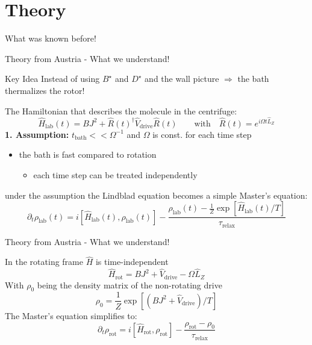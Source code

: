 \section{Theory}
\begin{frame}{What was known before!}
    
\end{frame}
\begin{frame}{Theory from Austria - What we understand!}
    \begin{bigidea}{Key Idea}
        Instead of using $B^\star$ and $D^\star$ and the wall picture $\Rightarrow$ the bath thermalizes the rotor!
    \end{bigidea}
    The Hamiltonian that describes the molecule in the centrifuge:
     \[
  \boxed{
    \hat{H}_{\mathrm{lab}}(t) =
  BJ^2 + \hat{R}(t)^\dagger
  \hat{V}_{\mathrm{drive}}\hat{R}(t) 
  }
  \qquad \text{with}\quad
  \hat{R}(t) = e^{i\Omega t \hat{L}_{Z}}
\]
\textbf{1. Assumption:} $t_{\mathrm{bath}} << \Omega^{-1}$ and $\Omega$ is const. for each time step
\begin{itemize}
    \item the bath is fast compared to rotation
    \begin{itemize}
        \item each time step can be treated independently
    \end{itemize}
\end{itemize}
\vspace{0.1cm}
under the assumption the Lindblad equation becomes a simple Master's equation:
\[
\partial_t \rho_{\mathrm{lab}}(t)
=
i\left[\hat{H}_{\mathrm{lab}}(t), \rho_{\mathrm{lab}}(t)\right]
-
\frac{
\rho_{\mathrm{lab}}(t)
-
\frac{1}{Z}\exp\!\left[\hat{H}_{\mathrm{lab}}(t)/T\right]
}{
\tau_{\mathrm{relax}}
}
\]
    
\end{frame}

\begin{frame}{Theory from Austria - What we understand!}
   
In the rotating frame $\hat{H}$ is time-independent
        \[
  \boxed{
    \hat{H}_{\mathrm{rot}} =
  BJ^2 + \hat{V}_{\mathrm{drive}} - \Omega \hat{L}_Z
  }
\]
With $\rho_0$ being the density matrix of the non-rotating drive
\[
\rho_0
=
\frac{1}{Z}
\exp\!\left[
\left(
BJ^2 + \hat{V}_{\mathrm{drive}}
\right)/T
\right]
\]
The Master's equation simplifies to:
\[
\partial_t \rho_{\mathrm{rot}}
=
i\left[\hat{H}_{\mathrm{rot}}, \rho_{\mathrm{rot}}\right]
-
\frac{
\rho_{\mathrm{rot}} - \rho_0
}{
\tau_{\mathrm{relax}}
}
\]
\end{frame}


